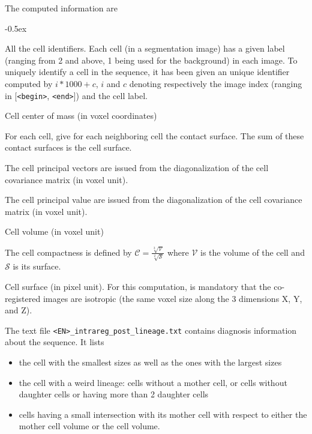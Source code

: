 The computed information are
\begin{description}
  \itemsep -0.5ex
\item[\texttt{all\_cells}] All the cell identifiers. Each cell (in a segmentation image) has a given label (ranging from 2 and above, 1 being used for the background) in each image. To uniquely identify a cell in the sequence, it has been given an unique identifier computed by $i * 1000 + c$, $i$ and $c$ denoting respectively the image index (ranging in [\texttt{<begin>}, \texttt{<end>}]) and the cell label.
\item[\texttt{cell\_barycenter}] Cell center of mass (in voxel coordinates)
\item[\texttt{cell\_contact\_surface}] For each cell, give for each neighboring cell the contact surface. The sum of these contact surfaces is the cell surface.
\item[\texttt{cell\_principal\_vectors}] The cell principal vectors are issued from the diagonalization of the cell covariance matrix (in voxel unit).
\item[\texttt{cell\_principal\_values}] The cell principal value are issued from the diagonalization of the cell covariance matrix (in voxel unit).
\item[\texttt{cell\_volume}] Cell volume (in voxel unit)
\item[\texttt{cell\_compactness}] The cell compactness is defined by $\mathcal{C} =\frac{\sqrt[3]{\mathcal{V}}}{\sqrt[2]{\mathcal{S}}}$ where $\mathcal{V}$ is the volume of the cell and $\mathcal{S}$ is its surface.
\item[\texttt{cell\_surface}] Cell surface (in pixel unit). For this computation, is mandatory that the co-registered images are isotropic (the same voxel size along the 3 dimensions X, Y, and Z).
\item[\texttt{cell\_lineage}]
\end{description}

The text file \texttt{<EN>\_intrareg\_post\_lineage.txt} contains diagnosis information about the sequence. It lists
\begin{itemize}
  \itemsep -0.5ex
\item the cell with the smallest sizes as well as the ones with the largest sizes
\item the cell with a weird lineage: cells without a mother cell, or cells without daughter cells or having more than 2 daughter cells
\item cells having a small intersection with its mother cell with respect to either the mother cell volume or the cell volume. 
\end{itemize}


